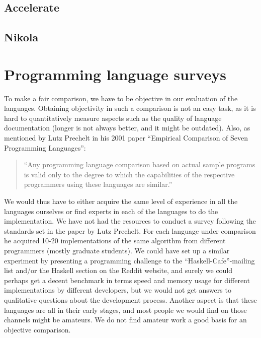\subsection{Accelerate}

\subsection{Nikola}

\section{Programming language surveys}
To make a fair comparison, we have to be objective in our evaluation
of the languages. Obtaining objectivity in such a comparison is not
an easy task, as it is hard to quantitatively measure aspects such as
the quality of language documentation (longer is not always better,
and it might be outdated). Also, as mentioned by Lutz Prechelt in his
2001 paper ``Empirical Comparison of Seven Programming Languages'':

\begin{quote}
  ``Any programming language comparison based on actual sample programs
  is valid only to the degree to which the capabilities of the
  respective programmers using these languages are similar.''
\end{quote}

We would thus have to either acquire the same level of experience in all the
languages ourselves or find experts in each of the languages to do the
implementation. We have not had the resources to conduct a survey
following the standards set in the paper by Lutz Prechelt. For each
language under comparison he acquired 10-20 implementations of the
same algorithm from different programmers (mostly graduate
students). We could have set up a similar experiment by presenting a
programming challenge to the ``Haskell-Cafe''-mailing list and/or the
Haskell section on the Reddit website, and surely we could perhaps get
a decent benchmark in terms speed and memory usage for different
implementations by different developers, but we would not get answers
to qualitative questions about the development process. Another aspect
is that these languages are all in their early stages, and most people
we would find on those channels might be amateurs. We do not find
amateur work a good basis for an objective comparison.


